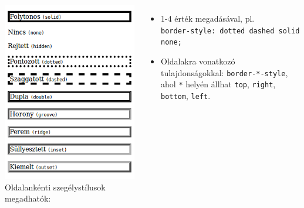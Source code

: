 \begin{frame}
  \begin{exampleblock}{}
    \scriptsize
    
  \end{exampleblock}
  \begin{columns}[T]
      \includegraphics[scale=0.25]{szegelyek1.png}
      Oldalankénti szegélystílusok megadhatók:
      \begin{itemize}
        \item 1-4 érték megadásával, pl. \\ \texttt{border-style: dotted dashed solid none;}
        \item Oldalakra vonatkozó tulajdonságokkal: 
        \texttt{border-*-style}, ahol \texttt{*} helyén állhat 
        \texttt{top}, \texttt{right}, \texttt{bottom}, \texttt{left}.
      \end{itemize}
  \end{columns} 
\end{frame}

